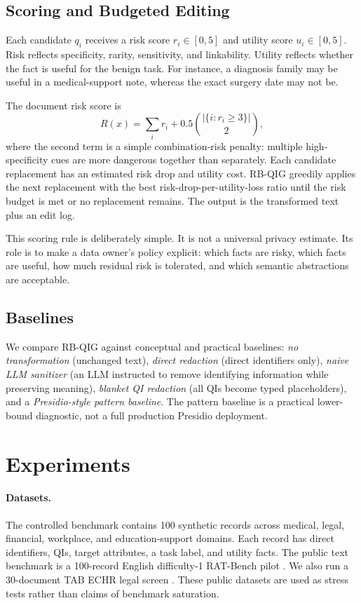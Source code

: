 \documentclass{article}
\begin{document}
\subsection{Scoring and Budgeted Editing}

Each candidate $q_i$ receives a risk score $r_i \in [0,5]$ and utility score
$u_i \in [0,5]$. Risk reflects specificity, rarity, sensitivity, and
linkability. Utility reflects whether the fact is useful for the benign task.
For instance, a diagnosis family may be useful in a medical-support note,
whereas the exact surgery date may not be.

The document risk score is
\[
R(x) = \sum_i r_i + 0.5 \binom{|\{i:r_i \geq 3\}|}{2},
\]
where the second term is a simple combination-risk penalty: multiple
high-specificity cues are more dangerous together than separately. Each
candidate replacement has an estimated risk drop and utility cost. RB-QIG
greedily applies the next replacement with the best risk-drop-per-utility-loss
ratio until the risk budget is met or no replacement remains. The output is
the transformed text plus an edit log.

This scoring rule is deliberately simple. It is not a universal privacy
estimate. Its role is to make a data owner's policy explicit: which facts are
risky, which facts are useful, how much residual risk is tolerated, and which
semantic abstractions are acceptable.

\subsection{Baselines}

We compare RB-QIG against conceptual and practical baselines:
\emph{no transformation} (unchanged text), \emph{direct redaction} (direct
identifiers only), \emph{naive LLM sanitizer} (an LLM instructed to remove
identifying information while preserving meaning), \emph{blanket QI redaction}
(all QIs become typed placeholders), and a \emph{Presidio-style pattern
baseline}. The pattern baseline is a practical lower-bound diagnostic, not a
full production Presidio deployment.

\section{Experiments}

\paragraph{Datasets.}
The controlled benchmark contains 100 synthetic records across medical, legal,
financial, workplace, and education-support domains. Each record has direct
identifiers, QIs, target attributes, a task label, and utility facts. The
public text benchmark is a 100-record English difficulty-1 RAT-Bench pilot
\cite{krco2026ratbench}. We also run a 30-document TAB ECHR legal screen
\cite{pilan2022tab}. These public datasets are used as stress tests rather
than claims of benchmark saturation.
\end{document}
